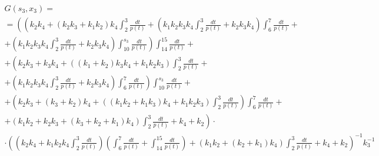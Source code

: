 \documentclass[a4paper,12pt]{article} %
\begin{document}
\begin{multline}
	G(s_3,x_3)=\\=
	\left(
		\left(
			k_2 k_4+\left( k_2 k_3+k_1 k_2\right)  k_4 \int_{2}^{3}\frac{dt}{p(t)}+
			\left( k_1 k_2 k_3 k_4 \int_{2}^{3}\frac{dt}{p(t)}+k_2 k_3 k_4\right)  \int_{6}^{7}\frac{dt}{p(t)}
			\right. \right. + \\ + \left. \left.
			\left( k_1 k_2 k_3 k_4 \int_{2}^{3}\frac{dt}{p(t)}+k_2 k_3 k_4\right)  \int_{10}^{s_3}\frac{dt}{p(t)}
		\right)
		\int_{14}^{15}\frac{dt}{p(t)}
		\right. + \\ + \left.
		\left( k_2 k_3+k_3 k_4+\left( \left( k_1+k_2\right)  k_3 k_4+k_1 k_2 k_3\right)  \int_{2}^{3}\frac{dt}{p(t)}
		\right. \right. + \\ + \left. \left.
		\left( k_1 k_2 k_3 k_4 \int_{2}^{3}\frac{dt}{p(t)}+k_2 k_3 k_4\right)  \int_{6}^{7}\frac{dt}{p(t)}\right)  \int_{10}^{s_3}\frac{dt}{p(t)}
		\right. + \\ + \left.
		\left( k_2 k_3+\left( k_3+k_2\right)  k_4+\left( \left( k_1 k_2+k_1 k_3\right)  k_4+k_1 k_2 k_3\right)  \int_{2}^{3}\frac{dt}{p(t)}\right)  \int_{6}^{7}\frac{dt}{p(t)}
		\right. + \\ + \left.
		\left( k_1 k_2+k_2 k_3+\left( k_3+k_2+k_1\right)  k_4\right)  \int_{2}^{3}\frac{dt}{p(t)}+k_4+k_2
	\right) \cdot \\ \cdot \left(
		\left( k_2 k_4+k_1 k_2 k_4 \int_{2}^{3}\frac{dt}{p(t)}\right)
		\left( \int_{6}^{7}\frac{dt}{p(t)}+ \int_{14}^{15}\frac{dt}{p(t)} \right)+
		\left( k_1 k_2+\left( k_2+k_1\right)  k_4\right)  \int_{2}^{3}\frac{dt}{p(t)}+k_4+k_2
	\right)^{-1}  k_3^{-1}
\end{multline}
\end{document}
